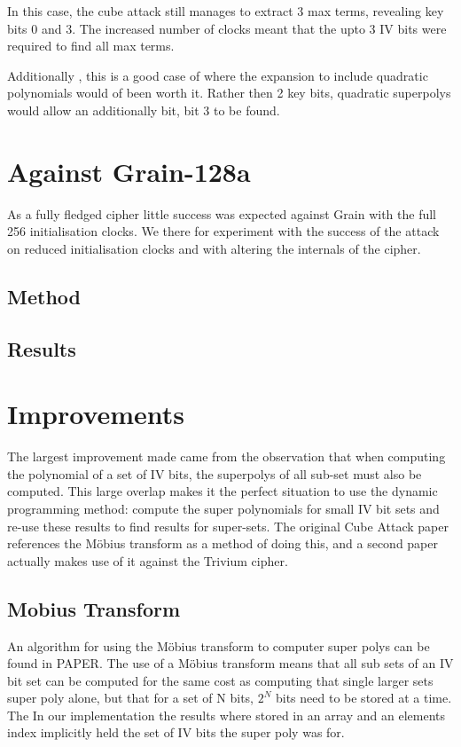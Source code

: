 \documentclass{report}
\let\Oldsection\section
\renewcommand{\section}{\FloatBarrier\Oldsection}
\let\Oldsubsection\subsection
\renewcommand{\subsection}{\FloatBarrier\Oldsubsection}
\begin{document}
In this case, the cube attack still manages to extract 3 max terms, revealing key bits 0 and 3. The increased number of clocks meant that the upto 3 IV bits were required to find all max terms.

Additionally , this is a good case of where the expansion to include quadratic polynomials would of been worth it. Rather then 2 key bits, quadratic superpolys would allow an additionally bit, bit 3 to be found.
\section{Against Grain-128a}
As a fully fledged cipher little success was expected against Grain with the full 256 initialisation clocks. We there for experiment with the success of the attack on reduced initialisation clocks and with altering the internals of the cipher.
\subsection{Method}
\subsection{Results}
\section{Improvements}
The largest improvement made came from the observation that when computing the polynomial of a set of IV bits, the superpolys of all sub-set must also be computed. This large overlap makes it the perfect situation to use the dynamic programming method: compute the super polynomials for small IV bit sets and re-use these results to find results for super-sets. The original Cube Attack paper references the Möbius transform as a method of doing this, and a second paper %
actually makes use of it against the Trivium cipher. %
\subsection{Mobius Transform}
An algorithm for using the Möbius transform to computer super polys can be found in PAPER.
The use of a Möbius transform means that all sub sets of an IV bit set can be computed for the same cost as computing that single larger sets super poly alone, but that for a set of N bits, $2^N$ bits need to be stored at a time. The In our implementation the results where stored in an array and an elements index implicitly held the set of IV bits the super poly was for.%
\end{document}
